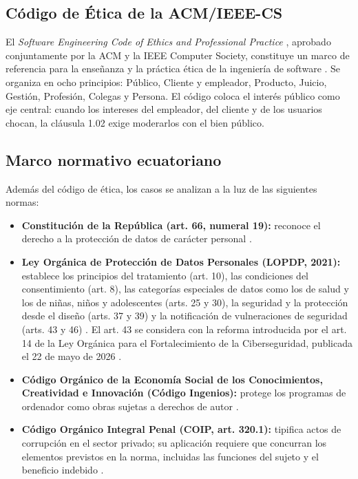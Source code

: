 \documentclass[12pt,a4paper,oneside]{article}
\newcommand{\cita}[1]{\cite{#1}}
\begin{document}
\subsection{Código de Ética de la ACM/IEEE-CS}

El \emph{Software Engineering Code of Ethics and Professional Practice} \cita{ref:acm}, aprobado conjuntamente por la ACM y la IEEE Computer Society, constituye un marco de referencia para la enseñanza y la práctica ética de la ingeniería de software \cita{ref:got}. Se organiza en ocho principios: Público, Cliente y empleador, Producto, Juicio, Gestión, Profesión, Colegas y Persona. El código coloca el interés público como eje central: cuando los intereses del empleador, del cliente y de los usuarios chocan, la cláusula 1.02 exige moderarlos con el bien público.

\subsection{Marco normativo ecuatoriano}

Además del código de ética, los casos se analizan a la luz de las siguientes normas:

\begin{itemize}[leftmargin=1.8em,itemsep=3pt,label=\textbullet]
    \item \textbf{Constitución de la República (art. 66, numeral 19):} reconoce el derecho a la protección de datos de carácter personal \cita{ref:const}.
    \item \textbf{Ley Orgánica de Protección de Datos Personales (LOPDP, 2021):} establece los principios del tratamiento (art. 10), las condiciones del consentimiento (art. 8), las categorías especiales de datos como los de salud y los de niñas, niños y adolescentes (arts. 25 y 30), la seguridad y la protección desde el diseño (arts. 37 y 39) y la notificación de vulneraciones de seguridad (arts. 43 y 46) \cita{ref:lopdp}. El art. 43 se considera con la reforma introducida por el art. 14 de la Ley Orgánica para el Fortalecimiento de la Ciberseguridad, publicada el 22 de mayo de 2026 \cita{ref:ciber}.
    \item \textbf{Código Orgánico de la Economía Social de los Conocimientos, Creatividad e Innovación (Código Ingenios):} protege los programas de ordenador como obras sujetas a derechos de autor \cita{ref:ingenios}.
    \item \textbf{Código Orgánico Integral Penal (COIP, art. 320.1):} tipifica actos de corrupción en el sector privado; su aplicación requiere que concurran los elementos previstos en la norma, incluidas las funciones del sujeto y el beneficio indebido \cita{ref:coip}.
\end{itemize}
\end{document}
